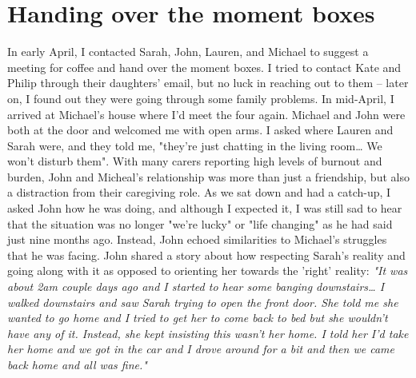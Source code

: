 \section{Handing over the moment boxes}
\label{Relationships:HandingMomentBox}
In early April, I contacted Sarah, John, Lauren, and Michael to suggest a meeting for coffee and hand over the moment boxes. I tried to contact Kate and Philip through their daughters' email, but no luck in reaching out to them – later on, I found out they were going through some family problems. In mid-April, I arrived at Michael's house where I'd meet the four again. Michael and John were both at the door and welcomed me with open arms. I asked where Lauren and Sarah were, and they told me, "they're just chatting in the living room… We won't disturb them". With many carers reporting high levels of burnout and burden, John and Micheal's relationship was more than just a friendship, but also a distraction from their caregiving role. As we sat down and had a catch-up, I asked John how he was doing, and although I expected it, I was still sad to hear that the situation was no longer "we're lucky" or "life changing" as he had said just nine months ago. Instead, John echoed similarities to Michael's struggles that he was facing. John shared a story about how respecting Sarah's reality and going along with it as opposed to orienting her towards the 'right' reality:
\textit{
"It was about 2am couple days ago and I started to hear some banging downstairs… I walked downstairs and saw Sarah trying to open the front door. She told me she wanted to go home and I tried to get her to come back to bed but she wouldn't have any of it. Instead, she kept insisting this wasn't her home. I told her I'd take her home and we got in the car and I drove around for a bit and then we came back home and all was fine."
}
